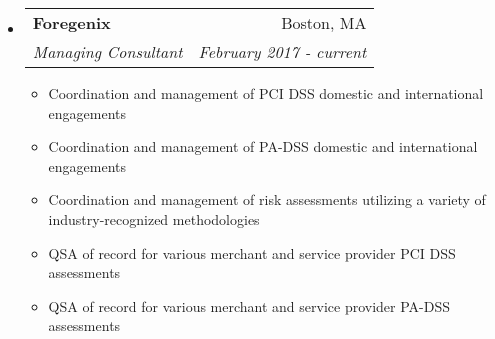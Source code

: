 \documentclass[letterpaper,11pt]{article}
\makeatletter
\newcommand{\resitem}[1]{\item #1 \vspace{-2pt}}
\newcommand{\ressubheading}[4]{
\begin{tabular*}{6.5in}{l@{\cftdotfill{\cftsecdotsep}\extracolsep{\fill}}r}
		\textbf{#1} & #2 \\
		\textit{#3} & \textit{#4} \\
\end{tabular*}\vspace{-6pt}}
\makeatother
\begin{document}
\begin{itemize}

\item
	\ressubheading{Foregenix}{Boston, MA}{Managing Consultant}{February 2017 - current}
	\begin{itemize}
      \resitem{Coordination and management of PCI DSS domestic and international engagements}
      \resitem{Coordination and management of PA-DSS domestic and international engagements}
      \resitem{Coordination and management of risk assessments utilizing a variety of industry-recognized methodologies}
      \resitem{QSA of record for various merchant and service provider PCI DSS assessments}
      \resitem{QSA of record for various merchant and service provider PA-DSS assessments}
	\end{itemize}


\end{itemize}
\end{document}

